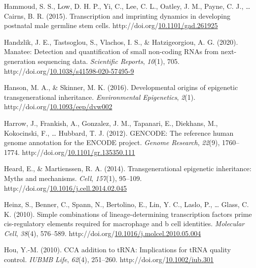 \documentclass[12pt,twoside]{reedthesis}
\newlength{\cslhangindent}
\newenvironment{CSLReferences}[2] %
 {%
  \setlength{\parindent}{0pt}
  \ifodd #1 \everypar{\setlength{\hangindent}{\cslhangindent}}\ignorespaces\fi
  \ifnum #2 > 0
  \setlength{\parskip}{#2\baselineskip}
  \fi
 }%
 {}
\begin{document}
\begin{CSLReferences}{1}{0}
\leavevmode{}%
Hammoud, S. S., Low, D. H. P., Yi, C., Lee, C. L., Oatley, J. M., Payne, C. J., \ldots{} Cairns, B. R. (2015). Transcription and imprinting dynamics in developing postnatal male germline stem cells. http://doi.org/\href{https://doi.org/10.1101/gad.261925}{10.1101/gad.261925}

\leavevmode{}%
Handzlik, J. E., Tastsoglou, S., Vlachos, I. S., \& Hatzigeorgiou, A. G. (2020). Manatee: Detection and quantification of small non-coding RNAs from next-generation sequencing data. \emph{Scientific Reports}, \emph{10}(1), 705. http://doi.org/\href{https://doi.org/10.1038/s41598-020-57495-9}{10.1038/s41598-020-57495-9}

\leavevmode{}%
Hanson, M. A., \& Skinner, M. K. (2016). Developmental origins of epigenetic transgenerational inheritance. \emph{Environmental Epigenetics}, \emph{2}(1). http://doi.org/\href{https://doi.org/10.1093/eep/dvw002}{10.1093/eep/dvw002}

\leavevmode{}%
Harrow, J., Frankish, A., Gonzalez, J. M., Tapanari, E., Diekhans, M., Kokocinski, F., \ldots{} Hubbard, T. J. (2012). GENCODE: The reference human genome annotation for the ENCODE project. \emph{Genome Research}, \emph{22}(9), 1760--1774. http://doi.org/\href{https://doi.org/10.1101/gr.135350.111}{10.1101/gr.135350.111}

\leavevmode{}%
Heard, E., \& Martienssen, R. A. (2014). Transgenerational epigenetic inheritance: Myths and mechanisms. \emph{Cell}, \emph{157}(1), 95--109. http://doi.org/\href{https://doi.org/10.1016/j.cell.2014.02.045}{10.1016/j.cell.2014.02.045}

\leavevmode{}%
Heinz, S., Benner, C., Spann, N., Bertolino, E., Lin, Y. C., Laslo, P., \ldots{} Glass, C. K. (2010). Simple combinations of lineage-determining transcription factors prime cis-regulatory elements required for macrophage and b cell identities. \emph{Molecular Cell}, \emph{38}(4), 576--589. http://doi.org/\href{https://doi.org/10.1016/j.molcel.2010.05.004}{10.1016/j.molcel.2010.05.004}

\leavevmode{}%
Hou, Y.-M. (2010). CCA addition to tRNA: Implications for tRNA quality control. \emph{IUBMB Life}, \emph{62}(4), 251--260. http://doi.org/\href{https://doi.org/10.1002/iub.301}{10.1002/iub.301}


\end{CSLReferences}
\end{document}
